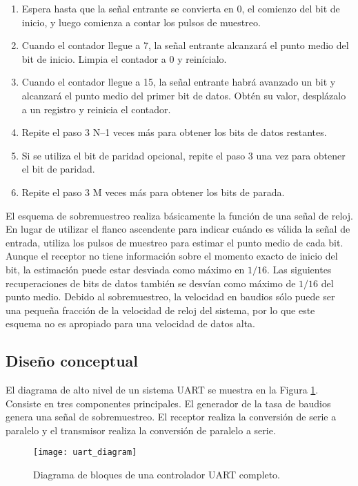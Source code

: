     \begin{enumerate}
      \item Espera hasta que la señal entrante se convierta en 0, el comienzo del bit de inicio, y luego comienza a contar los pulsos de muestreo.
      \item Cuando el contador llegue a 7, la señal entrante alcanzará el punto medio del bit de inicio. Limpia el contador a 0 y reinícialo.
      \item Cuando el contador llegue a 15, la señal entrante habrá avanzado un bit y alcanzará el punto medio del primer bit de datos. Obtén su valor, desplázalo a un registro y reinicia el contador.
      \item Repite el paso 3 N–1 veces más para obtener los bits de datos restantes.
      \item Si se utiliza el bit de paridad opcional, repite el paso 3 una vez para obtener el bit de paridad.
      \item Repite el paso 3 M veces más para obtener los bits de parada.
    \end{enumerate}

    El esquema de sobremuestreo realiza básicamente la función de una señal de reloj. En lugar de utilizar el flanco ascendente para indicar cuándo es válida la señal de entrada, utiliza los pulsos de muestreo para estimar el punto medio de cada bit. Aunque el receptor no tiene información sobre el momento exacto de inicio del bit, la estimación puede estar desviada como máximo en $1/16$. Las siguientes recuperaciones de bits de datos también se desvían como máximo de $1/16$ del punto medio. Debido al sobremuestreo, la velocidad en baudios sólo puede ser una pequeña fracción de la velocidad de reloj del sistema, por lo que este esquema no es apropiado para una velocidad de datos alta.


    \subsection{Diseño conceptual}

      El diagrama de alto nivel de un sistema UART se muestra en la Figura \ref{fig:uart_diagram}. Consiste en tres componentes principales. El generador de la tasa de baudios genera una señal de sobremuestreo. El receptor realiza la conversión de serie a paralelo y el transmisor realiza la conversión de paralelo a serie.

    \begin{figure}[h!]
      \centering
      \texttt{[image: uart\_diagram]}
      \caption{Diagrama de bloques de una controlador UART completo.}
      \label{fig:uart_diagram}
    \end{figure}

